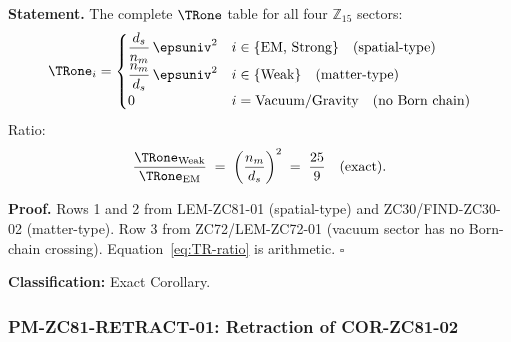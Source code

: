 \documentclass[12pt, a4paper]{article}
\begin{document}
\begin{formalbox}[title={COR-ZC81-01: Spatial-Type Class Theorem
  ($R_0$, Exact)}]

\textbf{Statement.}
The complete $\TRone$ table for all four $\mathbb{Z}_{15}$ sectors:
\begin{equation}
  \TRone_i =
  \begin{cases}
    \dfrac{d_s}{n_m}\,\epsuniv^2 & i \in \{\text{EM, Strong}\}
      \quad \text{(spatial-type)} \\[1.0ex]
    \dfrac{n_m}{d_s}\,\epsuniv^2 & i \in \{\text{Weak}\}
      \quad \text{(matter-type)} \\[1.0ex]
    0 & i = \text{Vacuum/Gravity}
      \quad \text{(no Born chain)}
  \end{cases}
  \label{eq:TR-full}
\end{equation}
Ratio:
\begin{equation}
  \frac{\TRone_{\rm Weak}}{\TRone_{\rm EM}}
  \;=\; \left(\frac{n_m}{d_s}\right)^2
  \;=\; \frac{25}{9}
  \quad \text{(exact)}.
  \label{eq:TR-ratio}
\end{equation}

\textbf{Proof.}
Rows 1 and 2 from LEM-ZC81-01 (spatial-type) and ZC30/FIND-ZC30-02
(matter-type). Row 3 from ZC72/LEM-ZC72-01 (vacuum sector has no
Born-chain crossing). Equation~\eqref{eq:TR-ratio} is arithmetic.
\hfill$\square$

\textbf{Classification:} Exact Corollary.
\end{formalbox}

\subsubsection{PM-ZC81-RETRACT-01: Retraction of COR-ZC81-02}
\end{document}
